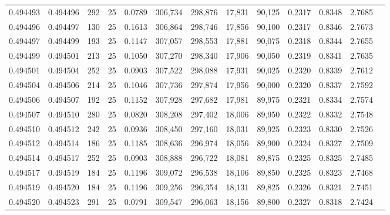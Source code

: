 \begin{tabular}{rrrrrrrrrrrrr}
0.494493 & 0.494496 &   292 &  25 &                                     0.0789 & 306,734 & 298,876 &  17,831 &  90,125 & 0.2317 & 0.8348 & 2.7685 \\
0.494496 & 0.494497 &   130 &  25 &                                     0.1613 & 306,864 & 298,746 &  17,856 &  90,100 & 0.2317 & 0.8346 & 2.7673 \\
0.494497 & 0.494499 &   193 &  25 &                                     0.1147 & 307,057 & 298,553 &  17,881 &  90,075 & 0.2318 & 0.8344 & 2.7655 \\
0.494499 & 0.494501 &   213 &  25 &                                     0.1050 & 307,270 & 298,340 &  17,906 &  90,050 & 0.2319 & 0.8341 & 2.7635 \\
0.494501 & 0.494504 &   252 &  25 &                                     0.0903 & 307,522 & 298,088 &  17,931 &  90,025 & 0.2320 & 0.8339 & 2.7612 \\
0.494504 & 0.494506 &   214 &  25 &                                     0.1046 & 307,736 & 297,874 &  17,956 &  90,000 & 0.2320 & 0.8337 & 2.7592 \\
0.494506 & 0.494507 &   192 &  25 &                                     0.1152 & 307,928 & 297,682 &  17,981 &  89,975 & 0.2321 & 0.8334 & 2.7574 \\
0.494507 & 0.494510 &   280 &  25 &                                     0.0820 & 308,208 & 297,402 &  18,006 &  89,950 & 0.2322 & 0.8332 & 2.7548 \\
0.494510 & 0.494512 &   242 &  25 &                                     0.0936 & 308,450 & 297,160 &  18,031 &  89,925 & 0.2323 & 0.8330 & 2.7526 \\
0.494512 & 0.494514 &   186 &  25 &                                     0.1185 & 308,636 & 296,974 &  18,056 &  89,900 & 0.2324 & 0.8327 & 2.7509 \\
0.494514 & 0.494517 &   252 &  25 &                                     0.0903 & 308,888 & 296,722 &  18,081 &  89,875 & 0.2325 & 0.8325 & 2.7485 \\
0.494517 & 0.494519 &   184 &  25 &                                     0.1196 & 309,072 & 296,538 &  18,106 &  89,850 & 0.2325 & 0.8323 & 2.7468 \\
0.494519 & 0.494520 &   184 &  25 &                                     0.1196 & 309,256 & 296,354 &  18,131 &  89,825 & 0.2326 & 0.8321 & 2.7451 \\
0.494520 & 0.494523 &   291 &  25 &                                     0.0791 & 309,547 & 296,063 &  18,156 &  89,800 & 0.2327 & 0.8318 & 2.7424 \\

\end{tabular}
